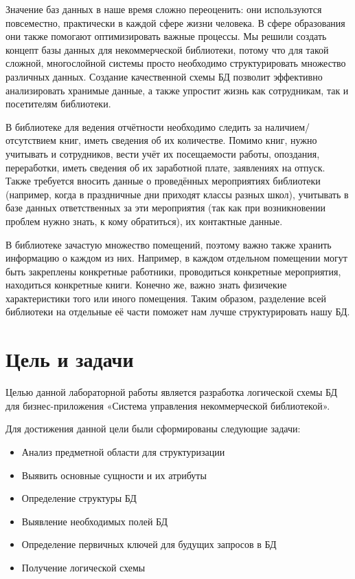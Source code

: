 \documentclass[14pt]{extreport}
\begin{document}
\pagestyle{empty} %


\pagestyle{plain} %
\tableofcontents

\intro

Значение баз данных в наше время сложно переоценить: они используются повсеместно, практически в каждой сфере жизни человека. В сфере образования они также помогают оптимизировать важные процессы. Мы решили создать концепт базы данных для некоммерческой библиотеки, потому что для такой сложной, многослойной системы просто необходимо структурировать множество различных данных. Создание качественной схемы БД позволит эффективно анализировать хранимые данные, а также упростит жизнь как сотрудникам, так и посетителям библиотеки. 

В библиотеке для ведения отчётности необходимо следить за наличием/отсутствием книг, иметь сведения об их количестве. Помимо книг, нужно учитывать и сотрудников, вести учёт их посещаемости работы, опоздания, переработки, иметь сведения об их заработной плате, заявлениях на отпуск. Также требуется вносить данные о проведённых мероприятиях библиотеки (например, когда в праздничные дни приходят классы разных школ), учитывать в базе данных ответственных за эти мероприятия (так как при возникновении проблем нужно знать, к кому обратиться), их контактные данные.

В библиотеке зачастую множество помещений, поэтому важно также хранить информацию о каждом из них. Например, в каждом отдельном помещении могут быть закреплены конкретные работники, проводиться конкретные мероприятия, находиться конкретные книги. Конечно же, важно знать физичекие характеристики того или иного помещения. Таким образом, разделение всей библиотеки на отдельные её части поможет нам лучше структурировать нашу БД.


\chapter{Цель и задачи}

Целью данной лабораторной работы является разработка логической схемы БД для бизнес-приложения «Система управления некоммерческой библиотекой».

Для достижения данной цели были сформированы следующие задачи:
\begin{itemize}
    \item Анализ предметной области для структуризации
    \item Выявить основные сущности и их атрибуты
    \item Определение структуры БД
    \item Выявление необходимых полей БД
    \item Определение первичных ключей для будущих запросов в БД
    \item Получение логической схемы
\end{itemize}
\end{document}
